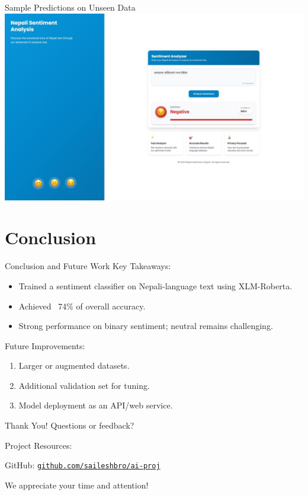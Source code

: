 \documentclass[aspectratio=169]{beamer}
\begin{document}
\begin{frame}{Sample Predictions on Unseen Data}
  \centering
  \includegraphics[width=0.75\linewidth]{visual.jpeg}
\end{frame}

\section{Conclusion}
\begin{frame}{Conclusion and Future Work}
  Key Takeaways:
  \begin{itemize}
    \item Trained a sentiment classifier on Nepali-language text using XLM-Roberta.
    \item Achieved ~74\% of overall accuracy.
    \item Strong performance on binary sentiment; neutral remains challenging.
  \end{itemize}

  Future Improvements:
  \begin{enumerate}
    \item Larger or augmented datasets.
    \item Additional validation set for tuning.
    \item Model deployment as an API/web service.
  \end{enumerate}
\end{frame}

\begin{frame}{Thank You!}
  \centering
  Questions or feedback?

  \vspace{2em}

  Project Resources:

  {\footnotesize
  GitHub: {\texttt{\href{https://github.com/saileshbro/ai-proj}{github.com/saileshbro/ai-proj}}}}

  \vspace{2em}

  We appreciate your time and attention!
\end{frame}
\end{document}
